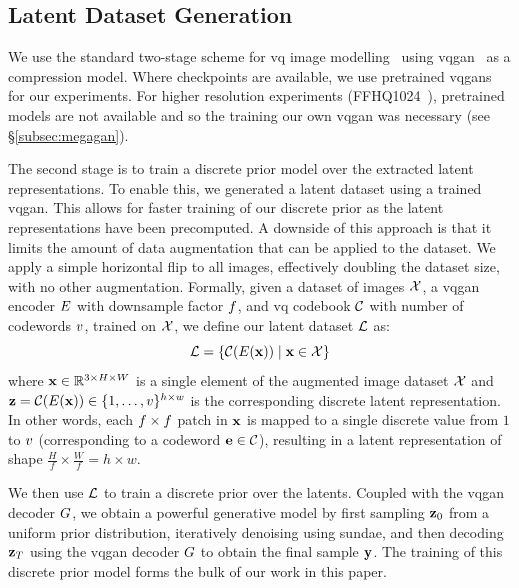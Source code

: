 \subsection{Latent Dataset Generation}
\label{subsec:datasetGen}

We use the standard two-stage scheme for \gls{vq} image
modelling~\cite{oord2018neural,razavi2019generating,esser2021taming,bondtaylor2021unleashing}
using \gls{vqgan}~\cite{esser2021taming} as a compression model. Where
checkpoints are available, we use pretrained \glspl{vqgan} for our experiments.
For higher resolution experiments (FFHQ1024~\cite{karras2019stylebased}),
pretrained models are not available and so the training our own \gls{vqgan} was
necessary (see \S\ref{subsec:megagan}). 

The second stage is to train a discrete prior model over the extracted latent
representations. To enable this, we generated a latent dataset using a trained
\gls{vqgan}. This allows for faster training of our discrete prior as the
latent representations have been precomputed. A downside of this
approach is that it limits the amount of data augmentation that can be applied
to the dataset. We apply a simple horizontal flip to all images, effectively
doubling the dataset size, with no other augmentation. Formally, given a dataset
of images $\mathcal{X}$, a \gls{vqgan} encoder $E$ with downsample
factor $f$, and \gls{vq} codebook $\mathcal{C}$ with number of
codewords $v$, trained on $\mathcal{X}$, we define our latent
dataset $\mathcal{L}$ as:
\begin{equation}
    \mathcal{L} = \{\mathcal{C}(E(\mathbf{x})) \mid \mathbf{x} \in \mathcal{X} \}
\end{equation}
where $\mathbf{x} \in \mathbb{R}^{3 \times H \times W}$ is a single element of the
augmented image
dataset $\mathcal{X}$ and $\mathbf{z} = \mathcal{C}(E(\mathbf{x})) \in \{1, \dots,
v\}^{h \times w}$ is the corresponding discrete latent
representation. In other words, each $f \times f$
patch in $\mathbf{x}$ is mapped to a single discrete value from $1$ to
$v$ (corresponding to a codeword $\mathbf{e} \in
\mathcal{C}$),
resulting in a latent representation of shape $\frac{H}{f} \times \frac{W}{f} =
h \times w$.

We then use $\mathcal{L}$ to train a discrete prior over the latents. Coupled
with the \gls{vqgan} decoder $G$, we obtain a powerful generative
model by first sampling $\mathbf{z}_0$ from a uniform prior distribution,
iteratively denoising using \gls{sundae}, and then decoding
$\mathbf{z}_T$ using the \gls{vqgan} decoder $G$ to obtain
the final sample $\mathbf{y}$. The training of this discrete prior model forms the
bulk of our work in this paper.

